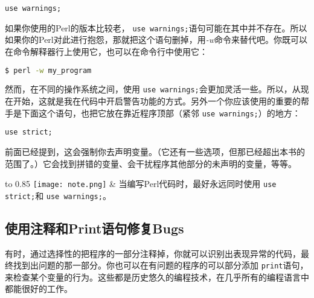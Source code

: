 \begin{lstlisting}
use warnings;
\end{lstlisting}

如果你使用的Perl的版本比较老， \verb|use warnings;|语句可能在其中并不存在。所以如果你的Perl对此进行抱怨，那就把这个语句删掉，用\textit{-w}命令来替代吧。你既可以在命令解释器行上使用它，也可以在命令行中使用它：

\begin{lstlisting}[language=bash]
$ perl -w my_program
\end{lstlisting}

然而，在不同的操作系统之间，使用 \verb|use warnings;|会更加灵活一些。所以，从现在开始，这就是我在代码中开启警告功能的方式。另外一个你应该使用的重要的帮手是下面这个语句，也把它放在靠近程序顶部（紧邻 \verb|use warnings;|）的地方：

\begin{lstlisting}
use strict;
\end{lstlisting}

前面已经提到，这会强制你去声明变量。（它还有一些选项，但那已经超出本书的范围了。）它会找到拼错的变量、会干扰程序其他部分的未声明的变量，等等。


\vspace{-5pt}
\begin{table}[h]
  \begin{center}
    \begin{tabu*} to 0.85\linewidth {|X[1,r,m]X[15,l,m]|}
      \tabucline{-}
      \texttt{[image: note.png]} & 当编写Perl代码时，最好永远同时使用 \verb|use strict;|和 \verb|use warnings;|。\\
      \tabucline{-}
    \end{tabu*}
  \end{center}
\end{table}
\vspace{-20pt}

\subsection{使用注释和Print语句修复Bugs}
有时，通过选择性的把程序的一部分注释掉，你就可以识别出表现异常的代码，最终找到出问题的那一部分。你也可以在有问题的程序的可以部分添加 \verb|print|语句，来检查某个变量的行为。这些都是历史悠久的编程技术，在几乎所有的编程语言中都能很好的工作。

